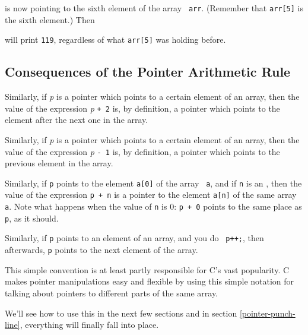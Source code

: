  is now pointing to the sixth element of the array {\tt
arr}.  (Remember that {\tt arr[5]} is the sixth element.)  Then


\noindent will print {\tt 119}, regardless of what {\tt arr[5]} was
holding before.

\subsection{Consequences of the Pointer Arithmetic Rule}

Similarly, if {\em p}\/ is a pointer which points to a certain element of
an array, then the value of the expression {\em p} {\tt + 2} is, by
definition, a pointer which points to the element after the next one in
the array.  

Similarly, if {\em p}\/ is a pointer which points to a certain element of
an array, then the value of the expression {\em p} {\tt - 1} is, by
definition, a pointer which points to the previous element in the array.

Similarly, if {\tt p} points to the element {\tt a[0]} of the array {\tt
a}, and if {\tt n} is an \int, then the value of the expression {\tt p +
n} is a pointer to the element {\tt a[n]} of the same array {\tt a}.
Note what happens when the value of {\tt n} is 0:  {\tt p + 0} points to
the same place as {\tt p}, as it should.

Similarly, if {\tt p} points to an element of an array, and you do {\tt
p++;}, then afterwards, {\tt p} points to the next element of the array.

This simple convention is at least partly responsible for C's vast
popularity.  C makes pointer manipulations easy and flexible by using
this simple notation for talking about pointers to different parts of
the same array.

We'll see how to use this in the next few sections and in section
\ref{pointer-punch-line}, everything will finally fall
into place.

